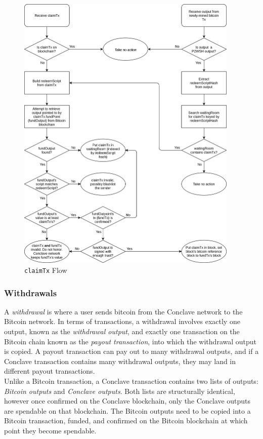 \documentclass{report}
\begin{document}
			
			\begin{figure}[H]
				\begin{center}
					\includegraphics[width=300pt]{img/ClaimTx-flow.png}
				\end{center}
				\caption{\texttt{claimTx} Flow}
				\label{fig:claimTxFlow}
			\end{figure}

			\subsubsection{Withdrawals} 
		
			A \textit{withdrawal} is where a user sends bitcoin from the Conclave network to the Bitcoin network. In terms of transactions, a withdrawal involves exactly one output, known as the \textit{withdrawal output}, and exactly one transaction on the Bitcoin chain known as the \textit{payout transaction}, into which the withdrawal output is copied. A payout transaction can pay out to many withdrawal outputs, and if a Conclave transaction contains many withdrawal outputs, they may land in different payout transactions. \\
			
			Unlike a Bitcoin transaction, a Conclave transaction contains two lists of outputs: \textit{Bitcoin outputs} and \textit{Conclave outputs}. Both lists are structurally identical, however once confirmed on the Conclave blockchain, only the Conclave outputs are spendable on that blockchain. The Bitcoin outputs need to be copied into a Bitcoin transaction, funded, and confirmed on the Bitcoin blockchain at which point they become spendable. \\
			
\end{document}
